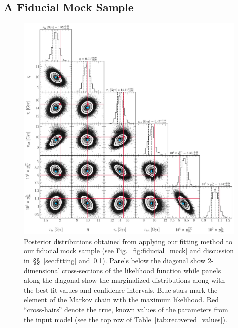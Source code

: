 \documentclass[ms.tex]{subfiles}
\begin{document}
\subsection{A Fiducial Mock Sample}
\label{sec:mocks:fiducial}

\begin{figure}
\centering
\includegraphics[scale = 0.45]{fiducial_512k.pdf}
\caption{
Posterior distributions obtained from applying our fitting method to our
fiducial mock sample (see Fig.~\ref{fig:fiducial_mock} and discussion
in~\S\S~\ref{sec:fitting} and~\ref{sec:mocks:fiducial}).
Panels below the diagonal show 2-dimensional cross-sections of the likelihood
function while panels along the diagonal show the marginalized distributions
along with the best-fit values and confidence intervals.
Blue stars mark the element of the Markov chain with the maximum likelihood.
Red ``cross-hairs'' denote the true, known values of the parameters from the
input model (see the top row of Table~\ref{tab:recovered_values}).
}
\label{fig:fiducial_mock_corner}
\end{figure}
\end{document}
